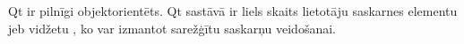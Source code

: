 Qt ir pilnīgi objektorientēts. Qt sastāvā ir liels skaits lietotāju saskarnes
elementu jeb vidžetu , ko var izmantot sarežģītu saskarņu veidošanai.







